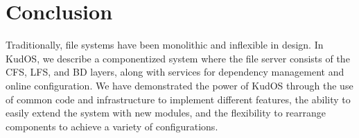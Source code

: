 \section{Conclusion}
\label{sec:conclusion}

Traditionally, file systems have been monolithic and inflexible in design. In
KudOS, we describe a componentized system where the file server consists of the
CFS, LFS, and BD layers, along with services for dependency management and
online configuration. We have demonstrated the power of KudOS through the use of
common code and infrastructure to implement different features, the ability to
easily extend the system with new modules, and the flexibility to rearrange
components to achieve a variety of configurations.
